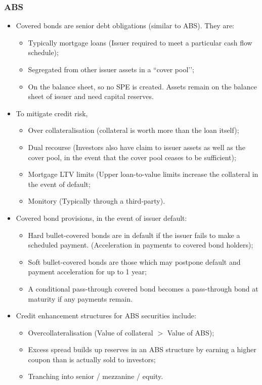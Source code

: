 \documentclass[../notes_compiled.tex]{subfiles}
\begin{document}
\subsubsection*{ABS}
\begin{itemize}
\item Covered bonds are senior debt obligations (similar to ABS). They are:
\begin{itemize}
\item Typically mortgage loans (Issuer required to meet a particular cash flow schedule);
\item Segregated from other issuer assets in a ``cover pool’’;
\item On the balance sheet, so no SPE is created. Assets remain on the balance sheet of issuer and need capital reserves.
\end{itemize}
\item To mitigate credit risk,
\begin{itemize}
\item Over collateralisation (collateral is worth more than the loan itself);
\item Dual recourse (Investors also have claim to issuer assets as well as the cover pool, in the event that the cover pool ceases to be sufficient);
\item Mortgage LTV limits (Upper loan-to-value limits increase the collateral in the event of default;
\item Monitory (Typically through a third-party).
\end{itemize}

\item Covered bond provisions, in the event of issuer default:
\begin{itemize}
\item Hard bullet-covered bonds are in default if the issuer fails to make a scheduled payment. (Acceleration in payments to covered bond holders);
\item Soft bullet-covered bonds are those which may postpone default and payment acceleration for up to 1 year;
\item A conditional pass-through covered bond becomes a pass-through bond at maturity if any payments remain.
\end{itemize}

\item Credit enhancement structures for ABS securities include:
\begin{itemize}
\item Overcollateralisation (Value of collateral $>$ Value of ABS);
\item Excess spread builds up reserves in an ABS structure by earning a higher coupon than is actually sold to investors;
\item Tranching into senior / mezzanine / equity.
\end{itemize}


\end{itemize}
\end{document}
